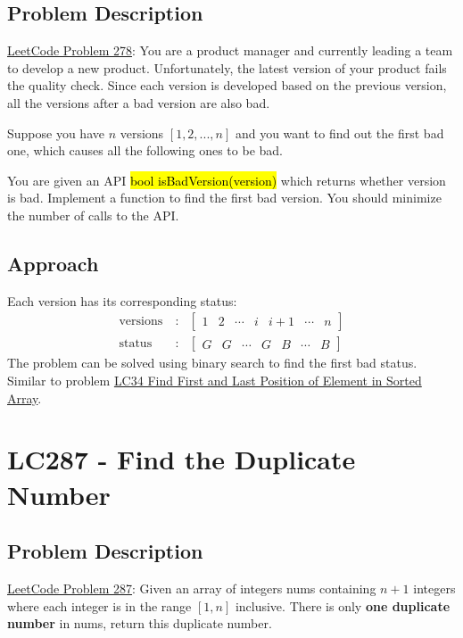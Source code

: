 \documentclass[justified]{tufte-book}
\begin{document}
\subsection{Problem Description}
\href{https://leetcode.com/problems/first-bad-version/}{LeetCode Problem 278}: You are a product manager and currently leading a team to develop a new product. Unfortunately, the latest version of your product fails the quality check. Since each version is developed based on the previous version, all the versions after a bad version are also bad.

Suppose you have $n$ versions $[1, 2, ..., n]$ and you want to find out the first bad one, which causes all the following ones to be bad.

You are given an API \hl{bool isBadVersion(version)} which returns whether version is bad. Implement a function to find the first bad version. You should minimize the number of calls to the API.

\subsection{Approach}
Each version has its corresponding status:
\begin{eqnarray*}
    \text{versions} ~ &:& \begin{bmatrix} 1 & 2 & \cdots & i & i+1 & \cdots & n \end{bmatrix} \\
    \text{status} ~ &:& \begin{bmatrix} G & G & \cdots & G & B & \cdots & B \end{bmatrix}
\end{eqnarray*}
The problem can be solved using binary search to find the first bad status. Similar to problem \hyperref[sec:lc34_find_first_last_position_sorted_array]{LC34 Find First and Last Position of Element in Sorted Array}.

\section{LC287 - Find the Duplicate Number}
\subsection{Problem Description}
\href{https://leetcode.com/problems/find-the-duplicate-number/}{LeetCode Problem 287}: Given an array of integers nums containing $n + 1$ integers where each integer is in the range $[1, n]$ inclusive. There is only \textbf{one duplicate number} in nums, return this duplicate number. 
\end{document}
